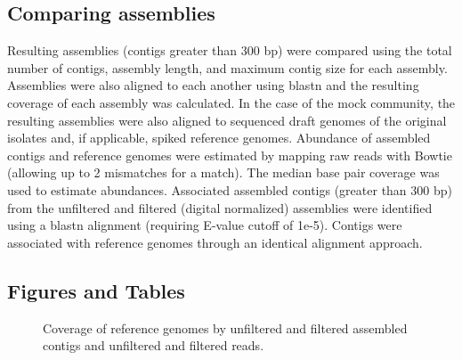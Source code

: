 \documentclass[11pt]{article} %
\begin{document}
\subsection{Comparing assemblies}
Resulting assemblies (contigs greater than 300 bp) were compared using the total number of contigs, assembly length, and maximum contig size for each assembly.  Assemblies were also aligned to each another using blastn and the resulting coverage of each assembly was calculated.  In the case of the mock community, the resulting assemblies were also aligned to sequenced draft genomes of the original isolates and, if applicable, spiked reference genomes. Abundance of assembled contigs and reference genomes were estimated by mapping raw reads with Bowtie (allowing up to 2 mismatches for a match).  The median base pair coverage was used to estimate abundances.  Associated assembled contigs (greater than 300 bp) from the unfiltered and filtered (digital normalized) assemblies were identified using a blastn alignment (requiring E-value cutoff of 1e-5).  Contigs were associated with reference genomes through an identical alignment approach.



\subsection{Figures and Tables}

\begin{landscape}
\begin{figure}[h!]
\caption{Coverage of reference genomes by unfiltered and filtered assembled contigs and unfiltered and filtered reads.}
\label{coverage1}
\end{figure}
\end{landscape}
\end{document}
